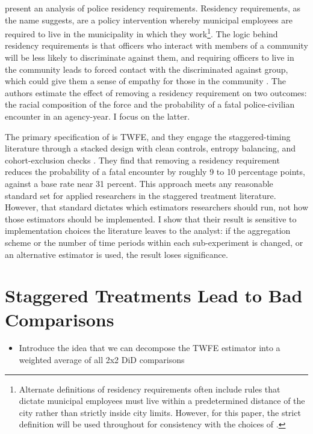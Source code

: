 \documentclass[12pt]{article}
\begin{document}
\textcite{payson2025residency} present an analysis of police residency requirements. Residency requirements, as the name suggests, are a policy intervention whereby municipal employees are required to live in the municipality in which they work\footnote{Alternate definitions of residency requirements often include rules that dictate municipal employees must live within a predetermined distance of the city rather than strictly inside city limits. However, for this paper, the strict definition will be used throughout for consistency with the choices of \textcite{payson2025residency}.}. The logic behind residency requirements is that officers who interact with members of a community will be less likely to discriminate against them, and requiring officers to live in the community leads to forced contact with the discriminated against group, which could give them a sense of empathy for those in the community \parencite{hopkins_politicized_2010, pettigrew_recent_2011, hubert_social_2022}. The authors estimate the effect of removing a residency requirement on two outcomes: the racial composition of the force and the probability of a fatal police-civilian encounter in an agency-year. I focus on the latter. 

The primary specification of \textcite{payson2025residency} is TWFE, and they engage the staggered-timing literature through a stacked design with clean controls, entropy balancing, and cohort-exclusion checks \parencite{cengiz2019effect}. They find that removing a residency requirement reduces the probability of a fatal encounter by roughly 9 to 10 percentage points, against a base rate near 31 percent. This approach meets any reasonable standard set for applied researchers in the staggered treatment literature. However, that standard dictates which estimators researchers should run, not how those estimators should be implemented. I show that their result is sensitive to implementation choices the literature leaves to the analyst: if the aggregation scheme or the number of time periods within each sub-experiment is changed, or an alternative estimator is used, the result loses significance.

\section{Staggered Treatments Lead to Bad Comparisons}

\begin{itemize}
    \item Introduce the idea that we can decompose the TWFE estimator into a weighted average of all 2x2 DiD comparisons
\end{itemize}
\end{document}
